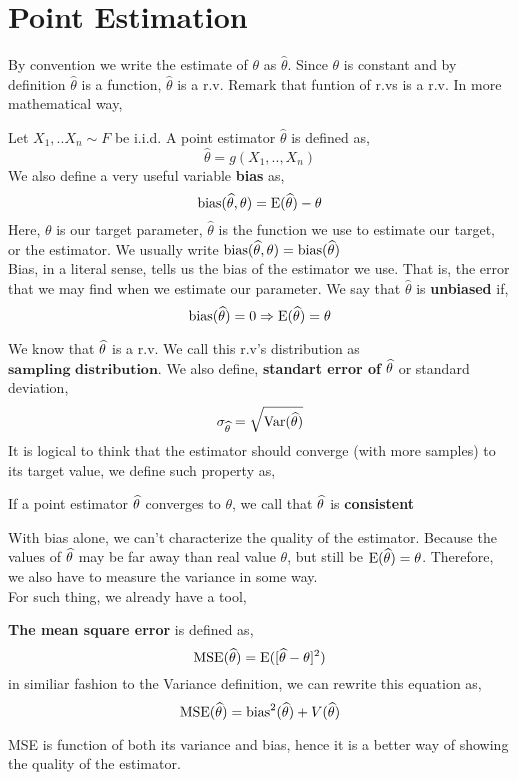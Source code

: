 \section{Point Estimation}
By convention we write the estimate of $\theta$ as $\widehat{\theta}$. Since $\theta$ is constant and by definition $\widehat{\theta}$ is a function, $\widehat{\theta}$ is a r.v. Remark that funtion of r.vs is a r.v. In more mathematical way,
\begin{definition}
    Let $X_1,..X_n \sim F$ be i.i.d. A point estimator $\widehat{\theta}$ is defined as,
    \[\widehat{\theta} = g(X_1,..,X_n)\]
    We also define a very useful variable \textbf{bias} as,
    \[\operatorname{bias}(\widehat{\theta}, \theta) = \operatorname{E}(\widehat{\theta}) - \theta\]
    Here, $\theta$ is our target parameter, $\widehat{\theta}$ is the function we use to estimate our target, or the estimator. We usually write $\operatorname{bias}(\widehat{\theta},\theta) = \operatorname{bias}(\widehat{\theta})$ 
    \\
    Bias, in a literal sense, tells us the bias of the estimator we use. That is, the error that we may find when we estimate our parameter. We say that $\widehat{\theta}$ is \textbf{unbiased} if,
    \[\operatorname{bias} (\widehat{\theta}) = 0 \Rightarrow {\operatorname{E}}(\widehat{\theta}) = \theta \]
\end{definition}
We know that ${\widehat{\theta}}$ is a r.v. We call this r.v's distribution as $\textbf{sampling distribution}$. We also define,
\textbf{standart error of} ${\widehat{\theta}}$ or standard deviation,
\[\sigma_{{\widehat{\theta}}}= \sqrt{{\operatorname{Var}}({\widehat{\theta}})}\]
It is logical to think that the estimator should converge (with more samples) to its target value, we define such property as,
\begin{definition}
    If a point estimator ${\widehat{\theta}}$ converges to $\theta$, we call that ${\widehat{\theta}}$ is \textbf{consistent}
\end{definition}

\par
With bias alone, we can't characterize the quality of the estimator. Because the values of ${\widehat{\theta}}$ may be far away than real value $\theta$, but still be ${\operatorname{E}}({\widehat{\theta}}) = \theta$. 
Therefore, we also have to measure the variance in some way.
\\
For such thing, we already have a tool,
\begin{definition} 
    \textbf{The mean square error} is defined as,
    \[\operatorname{MSE}({\widehat{\theta}}) = {\operatorname{E}}([{\widehat{\theta}} - \theta]^2) \]
    in similiar fashion to the Variance definition, we can rewrite this equation as,
    \[\operatorname{MSE}({\widehat{\theta}}) =\operatorname{bias}^2({\widehat{\theta}}) + V({\widehat{\theta}})\]
\end{definition}
MSE is function of both its variance and bias, hence it is a better way of showing the quality of the estimator.
